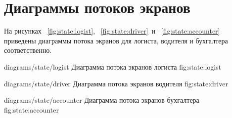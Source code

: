 \chapter{Диаграммы потоков экранов}
\label{chap:states}

На рисунках
~\ref{fig:state:logist},
~\ref{fig:state:driver}~и
~\ref{fig:state:accounter} 
приведены диаграммы потока экранов для 
логиста, водителя и бухгалтера соответственно.

\vfill
\image
    {diagrams/state/logist}
    {Диаграмма потока экранов логиста}
    {fig:state:logist}
\vfill

\image
    {diagrams/state/driver}
    {Диаграмма потока экранов водителя}
    {fig:state:driver}


\image
    {diagrams/state/accounter}
    {Диаграмма потока экранов бухгалтера}
    {fig:state:accounter}
